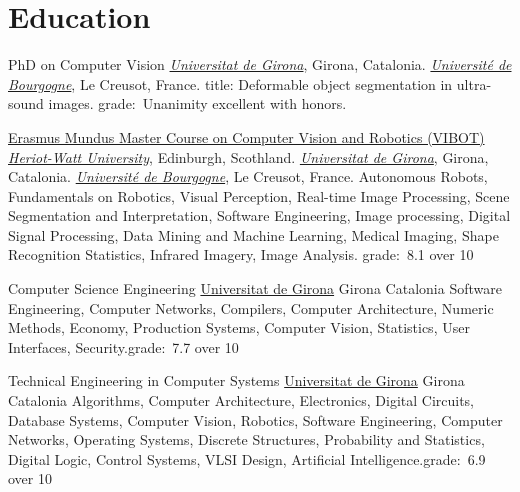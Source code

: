 \section{Education}

{PhD on Computer Vision}
{}
{}
{}
{\href{http://www.udg.edu}{\emph{Universitat de Girona}}, Girona, Catalonia.
  \newline\href{http://www.u-bourgogne.fr}{\emph{Universit\'{e} de Bourgogne}}, Le Creusot, France.
  title: Deformable object segmentation in ultra-sound images.
  \newline grade:~Unanimity excellent with honors.
}

{\href{http://www.vibot.org}{Erasmus Mundus Master Course on Computer Vision and Robotics (VIBOT)}}
{}
{}
{}
{\href{http://www.hw.ac.uk}{\emph{Heriot-Watt University}}, Edinburgh, Scothland.
  \newline\href{http://www.udg.edu}{\emph{Universitat de Girona}}, Girona, Catalonia.
  \newline\href{http://www.u-bourgogne.fr}{\emph{Universit\'{e} de Bourgogne}}, Le Creusot, France.
  \newline
Autonomous Robots, Fundamentals on Robotics, Visual Perception, Real-time Image Processing, Scene Segmentation and Interpretation, Software Engineering, Image processing, Digital Signal Processing, Data Mining and Machine Learning, Medical Imaging, Shape Recognition Statistics, Infrared Imagery, Image Analysis.
  \newline grade:~8.1 over 10
}

                {Computer Science Engineering}
                {\newline\href{http://www.udg.edu}{Universitat de Girona}}
                {Girona}
                {Catalonia}
                {Software Engineering, Computer Networks, Compilers, Computer Architecture, Numeric Methods, Economy, Production Systems, Computer Vision, Statistics, User Interfaces, Security.\newline grade:~7.7 over 10
                }

                {Technical Engineering in Computer Systems}
                {\newline\href{http://www.udg.edu}{Universitat de Girona}}
                {Girona}
                {Catalonia}
                {Algorithms, Computer Architecture, Electronics, Digital Circuits, Database Systems, Computer Vision, Robotics, Software Engineering, Computer Networks, Operating Systems, Discrete Structures, Probability and Statistics, Digital Logic, Control Systems, VLSI Design, Artificial Intelligence.\newline grade:~6.9 over 10}

